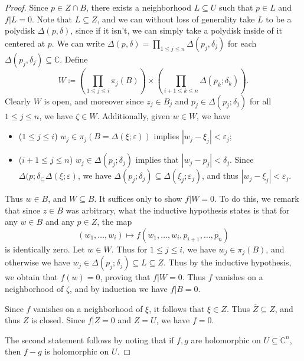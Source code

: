 \documentclass[11pt, letterpaper]{article}
\theoremstyle{plain}
\begin{document}
\begin{proof}
	Since $p\in Z \cap B$, there exists a neighborhood $L\subseteq U$ such that $p\in L$ and $f|L=0$. Note that $L\subseteq Z$, and we can without loss of generality take $L$ to be a polydisk $\Delta (p,\delta )$, since if it isn't, we can simply take a polydisk inside of it centered at $p$. We can write $\Delta (p,\delta )=\prod_{1\leq j\leq n} \Delta (p_j,\delta _j)$ for each $\Delta (p_j,\delta _j)\subseteq \mathbb{C} $. Define
	\[
		W\coloneqq \left( \prod_{1\leq j\leq i} \pi _j(B) \right) \times \left( \prod_{i+1 \leq k \leq n} \Delta (p_k;\delta _k) \right) 
	.\]
	Clearly $W$ is open, and moreover since $z_j\in B_j$ and $p_j\in \Delta (p_j ; \delta _j)$ for all $1\leq j\leq n$, we have $\zeta \in W$. Additionally, given $w\in W$, we have
	\begin{itemize}
		\item ($1 \leq j\leq i$) $w_j\in \pi _j(B=\Delta (\xi ;\varepsilon ))$ implies $\left| w_j-\xi _j \right| <\varepsilon _j$;
		\item ($i+1 \leq j \leq n$) $w_j\in \Delta (p_j ; \delta _j)$ implies that $\left| w_j-p_j \right| <\delta _j$. Since $\Delta (p ; \delta _\subseteq \Delta (\xi ;\varepsilon )$, we have $\Delta (p_j;\delta _j)\subseteq \Delta (\xi _j;\varepsilon _j)$, and thus $\left| w_j-\xi _j \right| <\varepsilon _j$.
	\end{itemize}
	Thus $w\in B$, and $W\subseteq B$. It suffices only to show $f|W=0$. To do this, we remark that since $z\in B$ was arbitrary, what the inductive hypothesis states is that for any $w\in B$ and any $p\in Z$, the map
	\[
		(w_1, \ldots ,w_i)\mapsto f(w_1, \ldots ,w_i,p_{i+1} , \ldots ,p_n)
	\]
	is identically zero. Let $w\in W$. Thus for $1\leq j\leq i$, we have $w_j\in \pi _j(B)$, and otherwise we have $w_j\in \Delta (p_j;\delta_j)\subseteq L\subseteq Z$. Thus by the inductive hypothesis, we obtain that $f(w)=0$, proving that $f|W=0$. Thus $f$ vanishes on a neighborhood of $\zeta $, and by induction we have $f|B=0$.

	Since $f$ vanishes on a neighborhood of $\xi $, it follows that $\xi \in Z$. Thus $\overline{Z}  \subseteq Z$, and thus $Z$ is closed. Since $f|Z=0$ and $Z=U$, we have $f=0$.

	The second statement follows by noting that if $f,g$ are holomorphic on $U\subseteq \mathbb{C} ^n$, then $f-g$ is holomorphic on $U$.
\end{proof}
\end{document}
